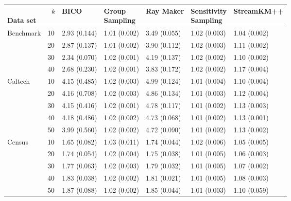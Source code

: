 \begin{longtable}{p{}llllll} 
\toprule
\parbox[t]{2cm}{\ \\Data set}  & \parbox[t]{5mm}{\ \\$k$} &           BICO & \parbox[t]{1cm}{Group\\Sampling} &      Ray Maker & \parbox[t]{1cm}{Sensitivity\\Sampling} &    StreamKM++ \\
\midrule
Benchmark & 10  &   2.93 (0.144) &   1.01 (0.002) &   3.49 (0.055) &         1.02 (0.003) &  1.04 (0.002) \\
      & 20  &   2.87 (0.137) &   1.01 (0.002) &   3.90 (0.112) &         1.02 (0.003) &  1.11 (0.002) \\
      & 30  &   2.34 (0.070) &   1.02 (0.001) &   4.19 (0.137) &         1.02 (0.002) &  1.10 (0.002) \\
      & 40  &   2.68 (0.230) &   1.02 (0.001) &   3.83 (0.172) &         1.02 (0.002) &  1.17 (0.004) \\
\midrule
Caltech & 10  &   4.15 (0.485) &   1.02 (0.003) &   4.99 (0.124) &         1.01 (0.004) &  1.10 (0.004) \\
      & 20  &   4.16 (0.708) &   1.02 (0.003) &   4.86 (0.134) &         1.01 (0.003) &  1.12 (0.004) \\
      & 30  &   4.15 (0.416) &   1.02 (0.001) &   4.78 (0.117) &         1.01 (0.002) &  1.13 (0.003) \\
      & 40  &   4.18 (0.486) &   1.02 (0.002) &   4.73 (0.068) &         1.01 (0.002) &  1.13 (0.001) \\
      & 50  &   3.99 (0.560) &   1.02 (0.002) &   4.72 (0.090) &         1.01 (0.002) &  1.13 (0.002) \\
\midrule
Census & 10  &   1.65 (0.082) &   1.03 (0.011) &   1.74 (0.044) &         1.02 (0.006) &  1.05 (0.005) \\
      & 20  &   1.74 (0.054) &   1.02 (0.004) &   1.75 (0.038) &         1.01 (0.005) &  1.06 (0.003) \\
      & 30  &   1.77 (0.063) &   1.02 (0.003) &   1.79 (0.032) &         1.01 (0.005) &  1.07 (0.002) \\
      & 40  &   1.83 (0.038) &   1.02 (0.002) &   1.81 (0.021) &         1.01 (0.005) &  1.08 (0.003) \\
      & 50  &   1.87 (0.088) &   1.02 (0.002) &   1.85 (0.044) &         1.01 (0.003) &  1.10 (0.059) \\

\end{longtable}
